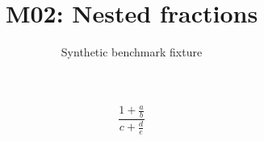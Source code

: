 \documentclass{article}
\title{M02: Nested fractions}
\author{Synthetic benchmark fixture}
\date{}
\begin{document}
\maketitle
\[\frac{1+\frac{a}{b}}{c+\frac{d}{e}}\]
\end{document}
